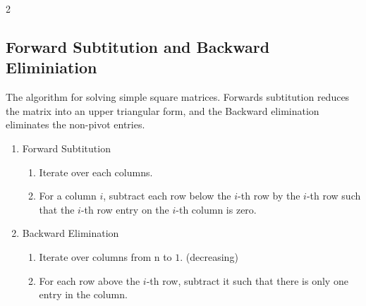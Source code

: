 \documentclass[5pt, a4paper]{article}
\begin{document}
\begin{multicols}{2}
    \subsection*{Forward Subtitution and Backward Eliminiation}
    The algorithm for solving simple square matrices. Forwards subtitution
    reduces the matrix into an upper triangular form, and the Backward
    elimination eliminates the non-pivot entries.
    \begin{enumerate}
        \item Forward Subtitution 
            \begin{enumerate}
                \item Iterate over each columns.
                \item For a column $i$, subtract each row below the $i$-th row by
                    the $i$-th row such that the $i$-th row entry on the $i$-th
                    column is zero.
            \end{enumerate}
        \item Backward Elimination
            \begin{enumerate}
                \item Iterate over columns from n to $1$. (decreasing)
                \item For each row above the $i$-th row, subtract it such that
                    there is only one entry in the column.
            \end{enumerate}
    \end{enumerate}

\end{multicols}     
\end{document}
